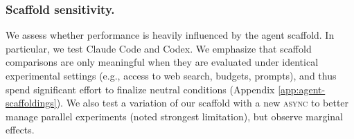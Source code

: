\documentclass[11pt]{article}
\let\oldtexttt\texttt
\renewcommand{\texttt}[1]{{\fontseries{m}\selectfont\oldtexttt{#1}}}
\newcommand{\kw}[1]{{\textsc{\MakeLowercase{#1}}}}
\theoremstyle{plain}
\theoremstyle{definition}
\theoremstyle{remark}
\begin{document}

\vspace{-0.2em}

\subsubsection{Scaffold sensitivity.}
We assess whether performance is heavily influenced by
the agent scaffold. In particular, we test Claude Code and Codex. We emphasize that scaffold comparisons are only meaningful when they are evaluated under identical experimental settings (e.g., access to web search, budgets, prompts), and thus spend significant effort to finalize neutral conditions (Appendix \ref{app:agent-scaffoldings}). We also test a variation of our scaffold with a new \kw{async} to better manage parallel experiments (noted strongest limitation), but observe marginal effects.
\end{document}
